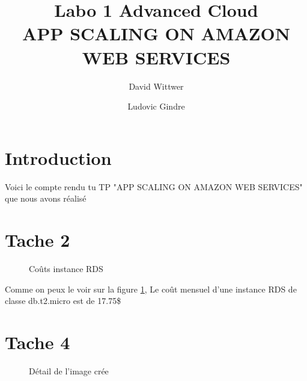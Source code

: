 \documentclass[french,a4paper,11pt]{article}
\title{Labo 1 Advanced Cloud\\APP SCALING ON AMAZON WEB SERVICES}
\author{David Wittwer \and Ludovic Gindre}
\begin{document}
    \maketitle
    \section{Introduction}\label{sec:introduction}
    Voici le compte rendu tu TP "APP SCALING ON AMAZON WEB SERVICES" que nous avons réalisé

    \section{Tache 2}\label{sec:task-2}

    \begin{figure}
        \caption{\label{rds-costs}Coûts instance RDS}
    \end{figure}
    Comme on peux le voir sur la figure \ref{rds-costs}, Le coût mensuel d'une instance RDS de classe db.t2.micro est de 17.75\$

    \section{Tache 4}\label{sec:task-4}

    \begin{figure}
        \caption{\label{ami-details}Détail de l'image crée}
    \end{figure}
\end{document}
